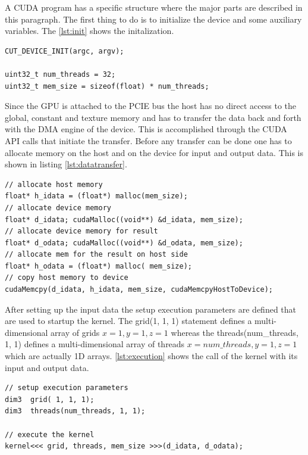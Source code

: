 A \gls{CUDA} program has a specific structure where the major parts are
described in this paragraph. The first thing to do is to initialize the device
and some auxiliary variables. The \autoref{lst:init} shows the
initalization.

%
\begin{lstlisting}[caption=Hardware initalization, label=lst:init]
CUT_DEVICE_INIT(argc, argv);

uint32_t num_threads = 32;
uint32_t mem_size = sizeof(float) * num_threads;				
\end{lstlisting} 
%

Since the \gls{GPU} is attached to the \gls{PCIE} bus the host has no direct
access to the global, constant and texture memory and has to transfer the data
back and forth with the \gls{DMA} engine of the device. This is accomplished
through the \gls{CUDA} \gls{API} calls that initiate the transfer. Before any
transfer can be done one has to allocate memory on the host and on the device
for input and output data. This is shown in listing \autoref{lst:datatransfer}.


\begin{lstlisting}[caption=Data transfer of data, label=lst:datatransfer]
// allocate host memory 
float* h_idata = (float*) malloc(mem_size);
// allocate device memory 
float* d_idata; cudaMalloc((void**) &d_idata, mem_size);
// allocate device memory for result
float* d_odata; cudaMalloc((void**) &d_odata, mem_size);
// allocate mem for the result on host side
float* h_odata = (float*) malloc( mem_size);
// copy host memory to device 
cudaMemcpy(d_idata, h_idata, mem_size, cudaMemcpyHostToDevice);
\end{lstlisting} 


After setting up the input data the setup execution parameters are defined that
are used to startup the kernel. The \textsf{grid(1, 1, 1)} statement defines
a multi-dimensional array of grids $x=1, y=1, z=1$ whereas the
\textsf{threads(num\_threads, 1, 1)} defines a multi-dimensional array of
threads $x=num\_threads, y=1, z=1$ which are actually \gls{1D} arrays.
\autoref{lst:execution} shows the call of the kernel with its input and
output data.


\begin{lstlisting}[caption=Execution of the Kernel, label=lst:execution]
// setup execution parameters
dim3  grid( 1, 1, 1);
dim3  threads(num_threads, 1, 1);

// execute the kernel
kernel<<< grid, threads, mem_size >>>(d_idata, d_odata);
\end{lstlisting} 

